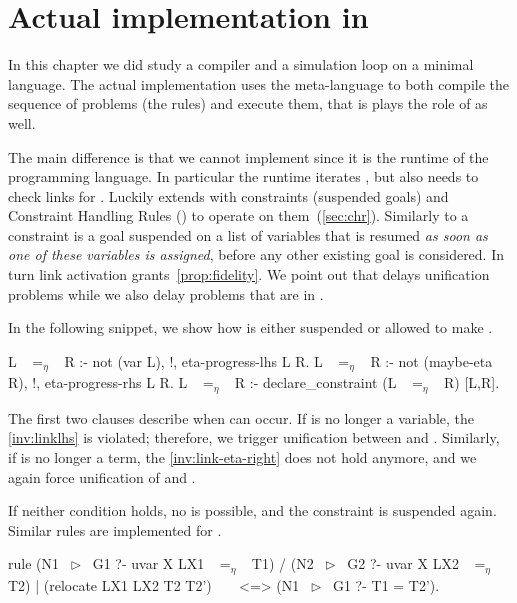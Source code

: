 %
\section{Actual implementation in \elpi}\label{sec:implementation}

In this chapter we did study a compiler and a simulation loop on a minimal language.
The actual implementation uses the \rocqelpi meta-language to both compile
the sequence of problems (the rules) and execute them, that is \elpi
plays the role of \Ho{} as well.

The main difference is that we cannot implement \hrun since it is
the runtime of the programming language. In particular the runtime iterates
\Ue, but \hstep also needs to check links for \progress. Luckily \elpi extends
\lprolog with constraints (suspended goals) and
Constraint Handling Rules (\chr) to operate on them~(\cref{sec:chr}).
Similarly to \cite{pfenning1993} a constraint is a goal %
suspended on a list of variables that is resumed \emph{as soon as one of these variables
is assigned}, before any other existing goal is considered. 
In turn link activation grants~\cref{prop:fidelity}.
We point out that \cite{pfenning1993} delays \notllambda unification problems
while we also delay problems that are in \maybeeta.

In the following snippet, we show how \linketa is either suspended or
allowed to make \progress.

\begin{elpicode}
L ~$=_\eta$~ R :- not (var L),       !, eta-progress-lhs L R.
L ~$=_\eta$~ R :- not (maybe-eta R), !, eta-progress-rhs L R.
L ~$=_\eta$~ R :- declare_constraint (L ~$=_\eta$~ R) [L,R].
\end{elpicode}

The first two clauses describe when \progress can occur. If  is no longer
a variable, the \cref{inv:linklhs} is violated; therefore, we trigger
unification between  and . Similarly, if  is no longer a
\maybeeta term, the \cref{inv:link-eta-right} does not hold anymore,
and we again force unification of  and .

If neither condition holds, no \progress is possible, and the constraint is
suspended again.
Similar rules are implemented for \linkbeta.

\begin{elpicode}
  rule (N1 ~$\triangleright$~ G1 ?- uvar X LX1 ~$=_\eta$~ T1)           %
    /  (N2 ~$\triangleright$~ G2 ?- uvar X LX2 ~$=_\eta$~ T2)           %
    |  (relocate LX1 LX2 T2 T2')           ~$\;$~    %
   <=> (N1 ~$\triangleright$~ G1 ?- T1 = T2').                  %
\end{elpicode}

